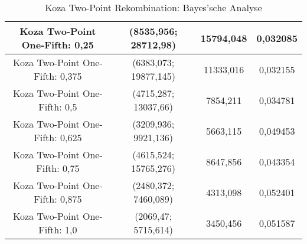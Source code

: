 \begin{table}[H]
\begin{tabular}{c | c | c | c}
		\hline
		Koza Two-Point One-Fifth: 0,25 & (\color{red}8535,956\color{black}; \color{red}28712,98\color{black}) & \color{red}15794,048\color{black} & \color{red}0,032085\color{black}\\
		\hline
		Koza Two-Point One-Fifth: 0,375 & (6383,073; 19877,145) & 11333,016 & \color{red}0,032155\color{black}\\
		\hline
		Koza Two-Point One-Fifth: 0,5 & (4715,287; 13037,66) & 7854,211 & 0,034781\\
		\hline
		Koza Two-Point One-Fifth: 0,625 & (3209,936; 9921,136) & 5663,115 & 0,049453\\
		\hline
		Koza Two-Point One-Fifth: 0,75 & (4615,524; 15765,276) & 8647,856 & 0,043354\\
		\hline
		Koza Two-Point One-Fifth: 0,875 & (2480,372; \color{Green}7460,089\color{black}) & 4313,098 & \color{Green}0,052401\color{black}\\
		\hline
		Koza Two-Point One-Fifth: 1,0 & (\color{Green}2069,47\color{black}; \color{Green}5715,614\color{black}) & \color{Green}3450,456\color{black} & 0,051587\\
	\end{tabular}
	\caption{Koza Two-Point Rekombination: Bayes'sche Analyse}
	\label{table:kozaTwoPointBayesian}
\end{table}


